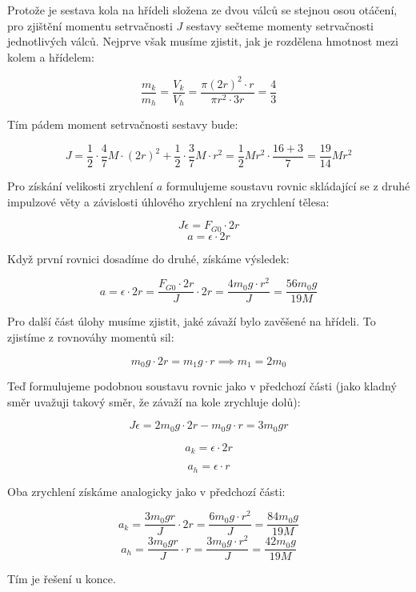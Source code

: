 \documentclass{fkssolpub}
\author{Ondřej Sedláček}
\begin{document}
 

Protože je sestava kola na hřídeli složena ze dvou válců se stejnou
osou otáčení, pro zjištění momentu setrvačnosti $J$ sestavy sečteme
momenty setrvačnosti jednotlivých válců. Nejprve však musíme zjistit,
jak je rozdělena hmotnost mezi kolem a hřídelem:

\[
  \frac{m_k}{m_h} = \frac{V_k}{V_h} = \frac{\pi (2r)^2 \cdot r}{\pi r^2 \cdot 3r}
    = \frac{4}{3}
\]

Tím pádem moment setrvačnosti sestavy bude:

\[
  J = \frac{1}{2} \cdot \frac{4}{7} M \cdot (2r)^2 + \frac{1}{2} \cdot \frac{3}{7} M \cdot r^2
    = \frac{1}{2} M r^2 \cdot \frac{16 + 3}{7} = \frac{19}{14} M r^2
\]

Pro získání velikosti zrychlení $a$ formulujeme soustavu rovnic
skládající se z druhé impulzové věty a závislosti úhlového zrychlení
na zrychlení tělesa:

\[
  J \epsilon = F_{G0} \cdot 2r
\]
\[
  a = \epsilon \cdot 2r
\]

Když první rovnici dosadíme do druhé, získáme výsledek:

\[
  a = \epsilon \cdot 2r = \frac{F_{G0} \cdot 2r}{J} \cdot 2r
    = \frac{4 m_0 g \cdot r^2}{J} = \frac{56 m_0 g}{19 M}
\]

Pro další část úlohy musíme zjistit, jaké závaží bylo zavěšené na hřídeli.
To zjistíme z rovnováhy momentů sil:

\[
  m_0 g \cdot 2r = m_1 g \cdot r \implies m_1 = 2 m_0
\]

Teď formulujeme podobnou soustavu rovnic jako v předchozí části (jako
kladný směr uvažuji takový směr, že závaží na kole zrychluje dolů):

\[
  J \epsilon = 2 m_0 g \cdot 2r - m_0 g \cdot r = 3 m_0 g r
\]

\[
  a_k = \epsilon \cdot 2r
\]

\[
  a_h = \epsilon \cdot r
\]

Oba zrychlení získáme analogicky jako v předchozí části:

\[
  a_k = \frac{3 m_0 g r}{J} \cdot 2r = \frac{6 m_0 g \cdot r^2}{J} 
      = \frac{84 m_0 g}{19 M}
\]
\[
  a_h = \frac{3 m_0 g r}{J} \cdot r = \frac{3 m_0 g \cdot r^2}{J}
      = \frac{42 m_0 g}{19 M}
\]

Tím je řešení u konce.
\end{document}
